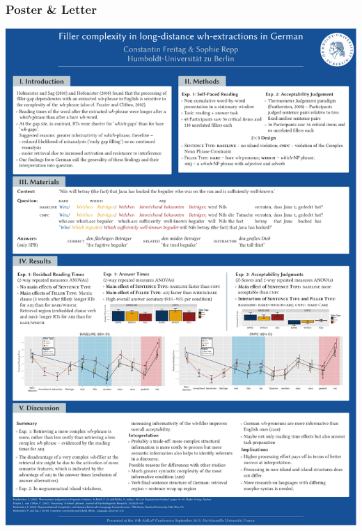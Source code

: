 {\begin{frame}
\begin{minipage}[c]{0.49\textwidth}
\end{minipage}
%         

\end{frame}


\begin{frame}
\frametitle{Poster \& Letter}


\begin{minipage}[b]{0.49\textwidth}
\centering
\includegraphics[width=0.80\linewidth]{../../texfiles-beamer/tex-material/WissArb-latex/Freitag_Repp_AMLaP_2013_A4.pdf}
\end{minipage}  
%  
\begin{minipage}[b]{0.49\textwidth}
\centering

\end{minipage}
\end{frame}}
